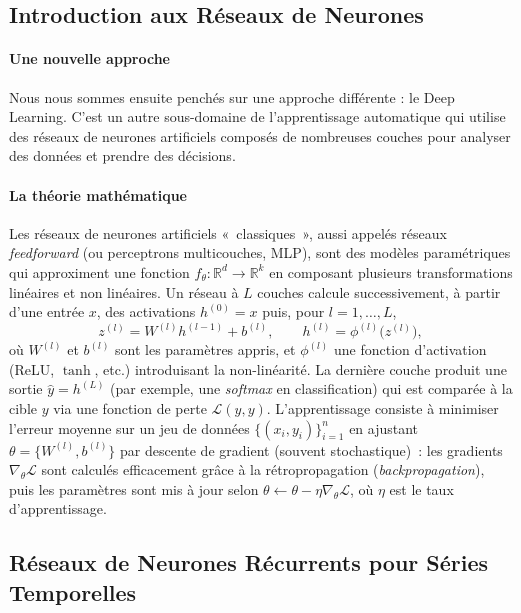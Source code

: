\documentclass{article}
\theoremstyle{nopointbreak}
\theoremstyle{nobrkbold}
\begin{document}
\subsection{Introduction aux Réseaux de Neurones}
\paragraph{Une nouvelle approche}
Nous nous sommes ensuite penchés sur une approche différente : le Deep Learning. C’est un autre sous-domaine de l'apprentissage automatique qui utilise des réseaux de neurones artificiels composés de nombreuses couches pour analyser des données et prendre des décisions.

\paragraph{La théorie mathématique}
Les réseaux de neurones artificiels «~classiques~», aussi appelés réseaux \emph{feedforward} (ou perceptrons multicouches, MLP), sont des modèles paramétriques qui approximent une fonction $f_\theta : \mathbb{R}^d \rightarrow \mathbb{R}^k$ en composant plusieurs transformations linéaires et non linéaires. Un réseau à $L$ couches calcule successivement, à partir d’une entrée $x$, des activations $h^{(0)} = x$ puis, pour $l=1,\dots,L$, 
\[
z^{(l)} = W^{(l)} h^{(l-1)} + b^{(l)}, 
\qquad 
h^{(l)} = \phi^{(l)}\!\big(z^{(l)}\big),
\]
où $W^{(l)}$ et $b^{(l)}$ sont les paramètres appris, et $\phi^{(l)}$ une fonction d’activation (ReLU, $\tanh$, etc.) introduisant la non-linéarité. La dernière couche produit une sortie $\hat{y}=h^{(L)}$ (par exemple, une \emph{softmax} en classification) qui est comparée à la cible $y$ via une fonction de perte $\mathcal{L}(\hat{y},y)$. L’apprentissage consiste à minimiser l’erreur moyenne sur un jeu de données $\{(x_i,y_i)\}_{i=1}^n$ en ajustant $\theta=\{W^{(l)},b^{(l)}\}$ par descente de gradient (souvent stochastique)~: les gradients $\nabla_\theta \mathcal{L}$ sont calculés efficacement grâce à la rétropropagation (\emph{backpropagation}), puis les paramètres sont mis à jour selon $\theta \leftarrow \theta - \eta \nabla_\theta \mathcal{L}$, où $\eta$ est le taux d’apprentissage.

\subsection{Réseaux de Neurones Récurrents pour Séries Temporelles} 
\end{document}
